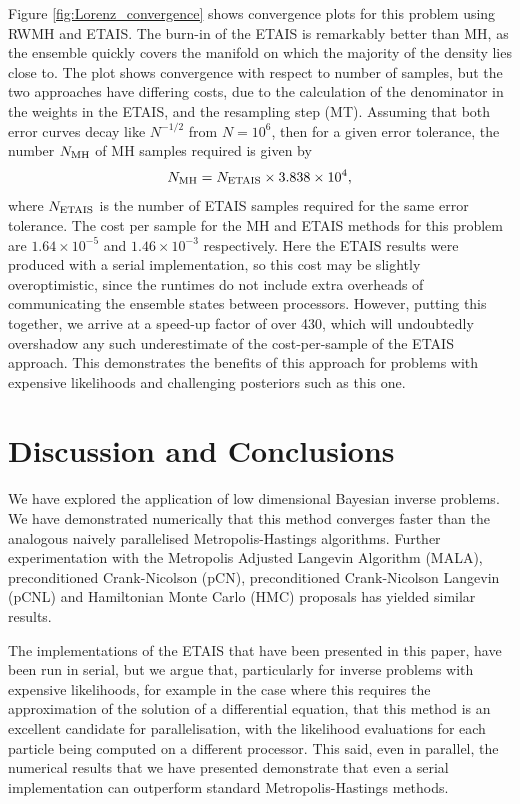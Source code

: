 \documentclass[final]{siamltex}
\begin{document}
{\red Figure \ref{fig:Lorenz_convergence} shows convergence plots for
  this problem using RWMH and ETAIS. The burn-in of the ETAIS is
  remarkably better than MH, as the ensemble quickly covers the
  manifold on which the majority of the density lies close to. The
  plot shows convergence with respect to number of samples, but the
  two approaches have differing costs, due to the calculation of the
  denominator in the weights in the ETAIS, and the resampling step
  (MT). Assuming that both error curves decay like $N^{-1/2}$ from
  $N=10^6$, then for a given error tolerance, the number $N_{\rm MH}$
  of MH samples required is given by
\[N_{\rm MH} = N_{\rm ETAIS} \times 3.838 \times 10^4,\]
where $N_{\rm ETAIS}$ is the number of ETAIS samples required for the
same error tolerance. The cost per sample for the MH and ETAIS methods
for this problem are $1.64 \times 10^{-5}$ and $1.46 \times 10^{-3}$
respectively. Here the ETAIS results were produced with a serial
implementation, so this cost may be slightly overoptimistic, since the
runtimes do not include extra overheads of communicating the ensemble
states between processors. However, putting this together, we arrive at a speed-up factor of
over 430, which will undoubtedly overshadow any such underestimate of
the cost-per-sample of the ETAIS approach. This demonstrates the benefits of this approach for
problems with expensive likelihoods and challenging posteriors such as
this one. 
}


\section{Discussion and Conclusions}\label{Sec:Conc} 

{\red We have explored the application of 
low dimensional Bayesian inverse problems. We have demonstrated numerically
that this method converges faster than the analogous naively parallelised
Metropolis-Hastings algorithms.} Further experimentation with the Metropolis
Adjusted Langevin Algorithm (MALA), preconditioned Crank-Nicolson (pCN),
preconditioned Crank-Nicolson Langevin (pCNL) and Hamiltonian
Monte Carlo (HMC) proposals has yielded similar results\cite{Paul}.

{\red The implementations of the ETAIS that have been presented in this
  paper, have been run in serial, but we argue that, particularly for
  inverse problems with expensive likelihoods, for example in the case
  where this requires the approximation of the solution of a
  differential equation, that this method is an excellent candidate
  for parallelisation, with the likelihood evaluations for each
  particle being computed on a different processor. This said, even in
  parallel, the numerical results that we have presented demonstrate
  that even a serial implementation can outperform standard
  Metropolis-Hastings methods.}
  
\end{document}
